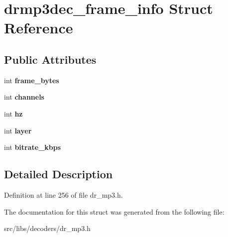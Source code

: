 \hypertarget{structdrmp3dec__frame__info}{\section{drmp3dec\-\_\-frame\-\_\-info Struct Reference}
\label{structdrmp3dec__frame__info}
}
\subsection*{Public Attributes}
\begin{DoxyCompactItemize}
\item 
\hypertarget{structdrmp3dec__frame__info_a723116fb9098d6299bb6b39082d5d46f}{int {\bfseries frame\-\_\-bytes}}\label{structdrmp3dec__frame__info_a723116fb9098d6299bb6b39082d5d46f}

\item 
\hypertarget{structdrmp3dec__frame__info_a3ac661a8ab7ea40df55a07d4c4d8646c}{int {\bfseries channels}}\label{structdrmp3dec__frame__info_a3ac661a8ab7ea40df55a07d4c4d8646c}

\item 
\hypertarget{structdrmp3dec__frame__info_abe77517f4ee3765ba556faa60ea1cb05}{int {\bfseries hz}}\label{structdrmp3dec__frame__info_abe77517f4ee3765ba556faa60ea1cb05}

\item 
\hypertarget{structdrmp3dec__frame__info_a91703350261bae1eb34df2e6a6e7661e}{int {\bfseries layer}}\label{structdrmp3dec__frame__info_a91703350261bae1eb34df2e6a6e7661e}

\item 
\hypertarget{structdrmp3dec__frame__info_ac8b0b572f5d049f8520abdd0ca0f9c49}{int {\bfseries bitrate\-\_\-kbps}}\label{structdrmp3dec__frame__info_ac8b0b572f5d049f8520abdd0ca0f9c49}

\end{DoxyCompactItemize}


\subsection{Detailed Description}


Definition at line 256 of file dr\-\_\-mp3.\-h.



The documentation for this struct was generated from the following file\-:\begin{DoxyCompactItemize}
\item 
src/libs/decoders/dr\-\_\-mp3.\-h\end{DoxyCompactItemize}

